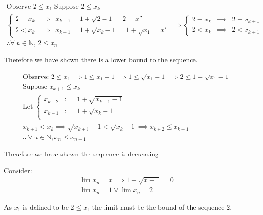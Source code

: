 \documentclass[../main.tex]{subfiles}
\begin{document}
\[
	\begin{gathered}
		\text{Observe } 2 \leq  x_1 \text{ Suppose }2 \leq x_k  \\
		{\left\{
		\begin{array}{ccc}
			2=x_{k} & \implies & x_{k+1} = 1+\sqrt{2-1} = 2  = x''              \\
			2<x_{k} & \implies & x_{k+1} = 1+\sqrt{x_k-1} = 1 + \sqrt{x_1} = x'
		\end{array}
		\right .} \implies 
		\left\{
		\begin{array}{ccc}
			2=x_k   & \implies & 2= x_{k+1} \\
			2 < x_k & \implies & 2 < x_{k+1}
		\end{array}
		\right . \\
        \therefore  \forall~ n \in  \mathbb{N}, ~2 \leq x_n 
	\end{gathered}
\]

Therefore we have shown there is a lower bound to the sequence. 

\[
    \begin{gathered}
        \text{Observe: }  2 \leq x_1  \implies 1 \leq x_1 - 1  \implies 1 \leq  \sqrt{x_1 - 1} \implies 2 \leq  1+\sqrt{x_1-1}

        \\
        \text{Suppose }x_{k+1} \leq  x_k \\
        \text{Let }
        \left\{ 
        \begin{array}{ccc}
            x_{k+2} & := & 1+\sqrt{x_{k+1}-1} \\
            x_{k+1} & := & 1+\sqrt{x_{k}-1} \\
        \end{array}
        \right . \\
        x_{k+1} < x_k \implies  \sqrt{x_{k+1}-1} < \sqrt{x_k -1} \implies  x_{k+2} \leq  x_{k+1} \\
        \therefore ~\forall~ n \in  \mathbb{N}, x_n \leq  x_{n-1}
    \end{gathered}
\] 

Therefore we have shown the sequence is decreasing. 

Consider:
\[
    \begin{gathered}
    \lim x_n = x \implies  1+\sqrt{x-1} = 0 \\
    \lim x_n = 1 \lor \lim x_n = 2
    \end{gathered}
\] 

As $x_1$ is defined to be $2 \leq x_1$ the limit must be the bound of the sequence $2$.
\end{document}
